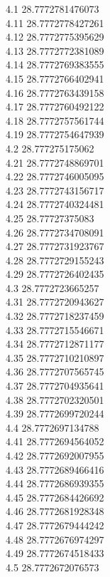 {4.1	28.7772781476073\\
4.11	28.7772778427261\\
4.12	28.7772775395629\\
4.13	28.7772772381089\\
4.14	28.7772769383555\\
4.15	28.7772766402941\\
4.16	28.7772763439158\\
4.17	28.7772760492122\\
4.18	28.7772757561744\\
4.19	28.7772754647939\\
4.2	28.777275175062\\
4.21	28.7772748869701\\
4.22	28.7772746005095\\
4.23	28.7772743156717\\
4.24	28.7772740324481\\
4.25	28.77727375083\\
4.26	28.7772734708091\\
4.27	28.7772731923767\\
4.28	28.7772729155243\\
4.29	28.7772726402435\\
4.3	28.7772723665257\\
4.31	28.7772720943627\\
4.32	28.7772718237459\\
4.33	28.7772715546671\\
4.34	28.7772712871177\\
4.35	28.7772710210897\\
4.36	28.7772707565745\\
4.37	28.7772704935641\\
4.38	28.7772702320501\\
4.39	28.7772699720244\\
4.4	28.7772697134788\\
4.41	28.7772694564052\\
4.42	28.7772692007955\\
4.43	28.7772689466416\\
4.44	28.7772686939355\\
4.45	28.7772684426692\\
4.46	28.7772681928348\\
4.47	28.7772679444242\\
4.48	28.7772676974297\\
4.49	28.7772674518433\\
4.5	28.7772672076573\\
}
